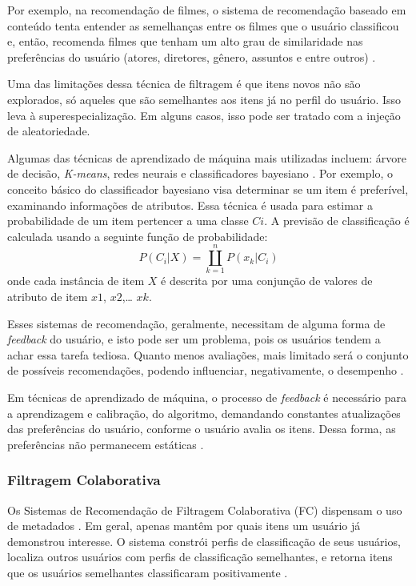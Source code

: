 Por exemplo, na recomendação de filmes, o sistema de recomendação baseado em conteúdo 
tenta entender as semelhanças entre os filmes que o usuário classificou e, então, recomenda filmes 
que tenham um alto grau de similaridade nas preferências do usuário (atores, diretores, gênero, assuntos e entre outros) \cite{adomavicius2005}.

Uma das limitações dessa técnica de filtragem é que itens novos não são explorados, só aqueles que são semelhantes 
aos itens já no perfil do usuário. Isso leva à superespecialização. Em alguns casos, isso pode ser tratado com a 
injeção de aleatoriedade\cite{paulson2003}.


Algumas das técnicas de aprendizado de máquina mais utilizadas incluem: árvore de decisão, \emph{K-means}, redes neurais e classificadores 
bayesiano \cite{son2017}. Por exemplo, o conceito básico do classificador bayesiano visa determinar se um item é preferível, examinando informações de 
atributos. Essa técnica é usada para estimar a probabilidade de um item 
pertencer a uma classe $Ci$. A previsão de classificação é calculada usando a 
seguinte função de probabilidade:
\begin{equation}
	P(C_{i}|X) = \coprod _{k=1}^{n} P(x_{k}|C_{i})
\end{equation}
onde cada instância de item $X$ é descrita por uma conjunção de valores de atributo de item $x1$, $x2$,… $xk$. 


Esses sistemas de recomendação, geralmente, necessitam de alguma forma de \emph{feedback} do usuário, e isto pode ser 
um problema, pois os usuários tendem a achar essa tarefa tediosa. Quanto menos avaliações, mais limitado 
será o conjunto de possíveis recomendações, podendo influenciar, negativamente, o desempenho \cite{paulson2003}. 

Em técnicas de aprendizado de máquina, o processo de \emph{feedback} é necessário para a aprendizagem e calibração, 
do algoritmo, demandando constantes atualizações das preferências do usuário, conforme o usuário avalia os itens. Dessa forma, 
as preferências não permanecem estáticas \cite{paulson2003}. 



\subsubsection{Filtragem Colaborativa}

Os Sistemas de Recomendação de Filtragem Colaborativa (FC) dispensam o uso de metadados \cite{mauricio}. 
Em geral, apenas mantêm por quais itens um usuário já demonstrou interesse. O sistema constrói perfis de classificação 
de seus usuários, localiza outros usuários com perfis de classificação 
semelhantes, e retorna itens que os usuários semelhantes classificaram 
positivamente \cite{son2017}.

